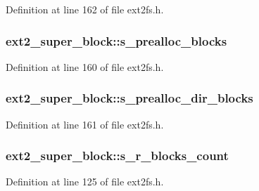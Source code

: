 \-Definition at line 162 of file ext2fs.\-h.

\hypertarget{structext2__super__block_a352689df3b3cb2a357bde6645e3c7f29}{
\subsubsection[{s\-\_\-prealloc\-\_\-blocks}]{ {\bf ext2\-\_\-super\-\_\-block\-::s\-\_\-prealloc\-\_\-blocks}}}\label{structext2__super__block_a352689df3b3cb2a357bde6645e3c7f29}


\-Definition at line 160 of file ext2fs.\-h.

\hypertarget{structext2__super__block_aa820a721fcbf64ee9aa797bca3171785}{
\subsubsection[{s\-\_\-prealloc\-\_\-dir\-\_\-blocks}]{ {\bf ext2\-\_\-super\-\_\-block\-::s\-\_\-prealloc\-\_\-dir\-\_\-blocks}}}\label{structext2__super__block_aa820a721fcbf64ee9aa797bca3171785}


\-Definition at line 161 of file ext2fs.\-h.

\hypertarget{structext2__super__block_a660db33fc94622167793c6b080c515e4}{
\subsubsection[{s\-\_\-r\-\_\-blocks\-\_\-count}]{ {\bf ext2\-\_\-super\-\_\-block\-::s\-\_\-r\-\_\-blocks\-\_\-count}}}\label{structext2__super__block_a660db33fc94622167793c6b080c515e4}


\-Definition at line 125 of file ext2fs.\-h.

